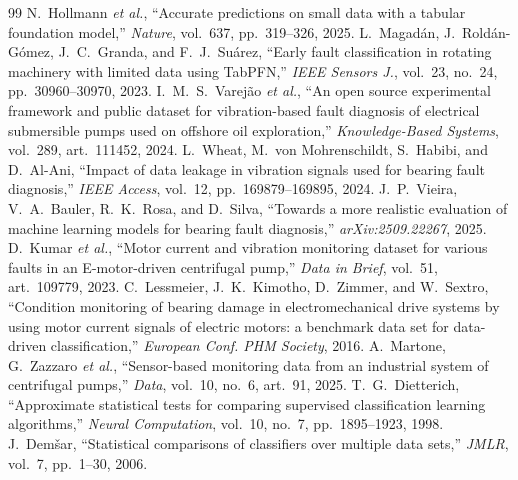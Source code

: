 \documentclass[conference,a4paper,10pt]{IEEEtran}
\begin{document}
\begin{thebibliography}{99}
 N.~Hollmann \emph{et al.}, ``Accurate predictions on small
data with a tabular foundation model,'' \emph{Nature}, vol.~637, pp.~319--326, 2025.
 L.~Magad\'an, J.~Rold\'an-G\'omez, J.~C.~Granda, and
F.~J.~Su\'arez, ``Early fault classification in rotating machinery with limited
data using TabPFN,'' \emph{IEEE Sensors J.}, vol.~23, no.~24, pp.~30960--30970, 2023.
 I.~M.~S.~Varej\~ao \emph{et al.}, ``An open source
experimental framework and public dataset for vibration-based fault diagnosis of
electrical submersible pumps used on offshore oil exploration,''
\emph{Knowledge-Based Systems}, vol.~289, art.~111452, 2024.
 L.~Wheat, M.~von Mohrenschildt, S.~Habibi, and D.~Al-Ani,
``Impact of data leakage in vibration signals used for bearing fault diagnosis,''
\emph{IEEE Access}, vol.~12, pp.~169879--169895, 2024.
 J.~P.~Vieira, V.~A.~Bauler, R.~K.~Rosa, and D.~Silva,
``Towards a more realistic evaluation of machine learning models for bearing
fault diagnosis,'' \emph{arXiv:2509.22267}, 2025.
 D.~Kumar \emph{et al.}, ``Motor current and vibration
monitoring dataset for various faults in an E-motor-driven centrifugal pump,''
\emph{Data in Brief}, vol.~51, art.~109779, 2023.
 C.~Lessmeier, J.~K.~Kimotho, D.~Zimmer, and W.~Sextro,
``Condition monitoring of bearing damage in electromechanical drive systems by
using motor current signals of electric motors: a benchmark data set for
data-driven classification,'' \emph{European Conf. PHM Society}, 2016.
 A.~Martone, G.~Zazzaro \emph{et al.}, ``Sensor-based monitoring
data from an industrial system of centrifugal pumps,'' \emph{Data}, vol.~10, no.~6,
art.~91, 2025. %
 T.~G.~Dietterich, ``Approximate statistical tests for
comparing supervised classification learning algorithms,'' \emph{Neural
Computation}, vol.~10, no.~7, pp.~1895--1923, 1998.
 J.~Dem\v{s}ar, ``Statistical comparisons of classifiers over
multiple data sets,'' \emph{JMLR}, vol.~7, pp.~1--30, 2006.
\end{thebibliography}
\end{document}
